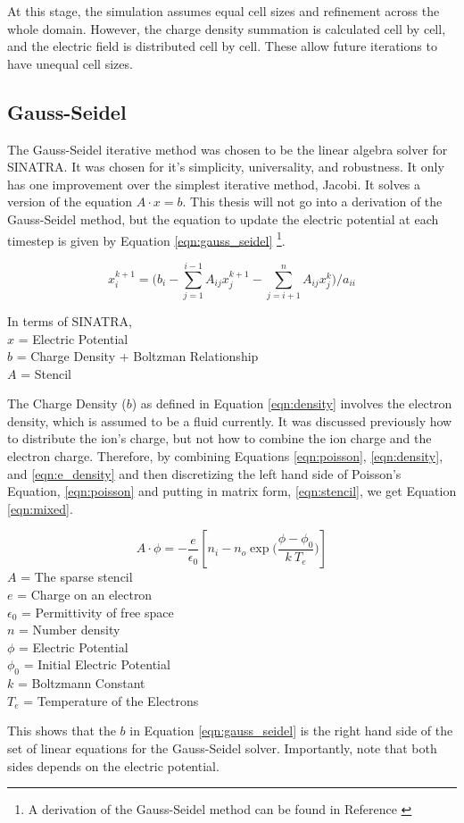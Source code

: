 \indent At this stage, the simulation assumes equal cell sizes and refinement across the whole domain. However, the charge density summation is calculated cell by cell, and the electric field is distributed cell by cell. These allow future iterations to have unequal cell sizes. \par


\subsection{Gauss-Seidel}
\label{sec:gauss}

The Gauss-Seidel iterative method was chosen to be the linear algebra solver for SINATRA. It was chosen for it's simplicity, universality, and robustness. It only has one improvement over the simplest iterative method, Jacobi. It solves a version of the equation \(A\cdot x = b\). This thesis will not go into a derivation of the Gauss-Seidel method, but the equation to update the electric potential at each timestep is given by Equation \ref{eqn:gauss_seidel} \footnote{A derivation of the Gauss-Seidel method can be found in Reference \cite{Gauss_eqn}}.

\begin{equation}
    \label{eqn:gauss_seidel}
    x_i^{k+1} = \Big( b_i - \sum_{j=1}^{i-1} A_{i j} x_j^{k+1} - \sum_{j=i+1}^n A_{i j} x_j^{k} \Big) / a_{ii}
\end{equation}

In terms of SINATRA, \\
\(x\) = Electric Potential \\
\(b\) = Charge Density + Boltzman Relationship \\
\(A\) = Stencil \par


\indent The Charge Density (\(b\)) as defined in Equation \ref{eqn:density} involves the electron density, which is assumed to be a fluid currently. It was discussed previously how to distribute the ion's charge, but not how to combine the ion charge and the electron charge. Therefore, by combining Equations \ref{eqn:poisson}, \ref{eqn:density}, and \ref{eqn:e_density} and then discretizing the left hand side of Poisson's Equation, \ref{eqn:poisson} and putting in matrix form, \ref{eqn:stencil}, we get Equation \ref{eqn:mixed}.

\begin{equation}
    \label{eqn:mixed}
    A \cdot \phi = - \frac{e}{\epsilon_0} [n_i - n_o \exp\Big(\frac{\phi - \phi_0}{k \: T_e}\Big)]
\end{equation}
\(A\) = The sparse stencil \\
\(e\) = Charge on an electron \\
\(\epsilon_0\) = Permittivity of free space \\
\(n\) = Number density \\
\(\phi\) = Electric Potential \\
\(\phi_0\) = Initial Electric Potential \\
\(k\) = Boltzmann Constant \\
\(T_e\) = Temperature of the Electrons \par

\indent This shows that the \(b\) in Equation \ref{eqn:gauss_seidel} is the right hand side of the set of linear equations for the Gauss-Seidel solver. Importantly, note that both sides depends on the electric potential. \par
